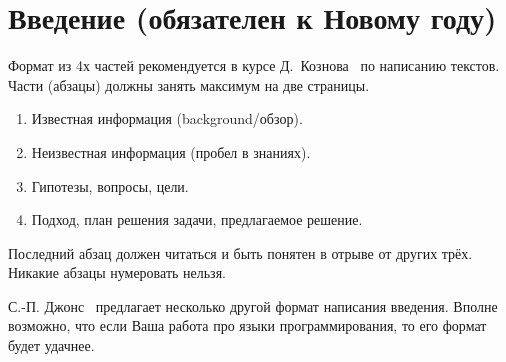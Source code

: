 
\section*{Введение (обязателен к Новому году)}
\thispagestyle{withCompileDate}

Формат из 4х частей рекомендуется в курсе Д.~Кознова~\cite{koznov} по написанию текстов.
Части (абзацы) должны занять максимум на две страницы.
\begin{enumerate}
\item Известная информация (background/обзор).
\item Неизвестная информация (пробел в знаниях).
\item Гипотезы, вопросы, цели.
\item Подход, план решения задачи, предлагаемое решение.
\end{enumerate}

Последний абзац должен читаться и быть понятен в отрыве от других трёх. Никакие абзацы нумеровать нельзя.

С.-П. Джонс~\cite{SPJGreatPaper} предлагает несколько другой формат написания введения.
Вполне возможно, что если Ваша работа про языки программирования, то его формат будет удачнее.



